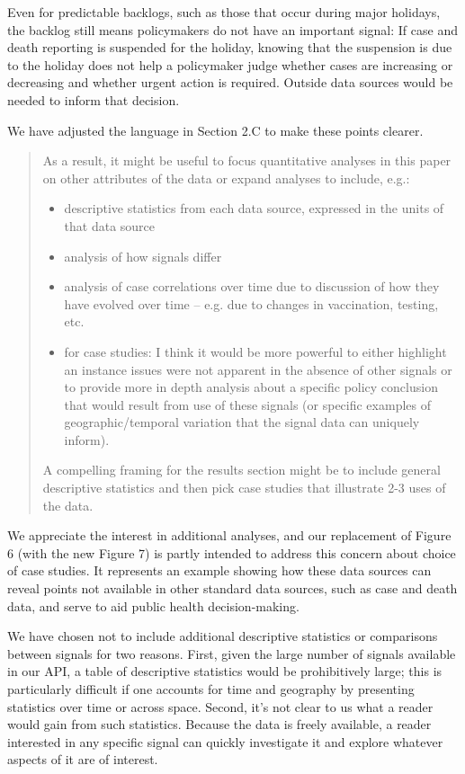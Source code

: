 \documentclass[11pt]{article}
\begin{document}
Even for predictable backlogs, such as those that occur during major holidays,
the backlog still means policymakers do not have an important signal: If case
and death reporting is suspended for the holiday, knowing that the suspension is
due to the holiday does not help a policymaker judge whether cases are
increasing or decreasing and whether urgent action is required. Outside data
sources would be needed to inform that decision.

We have adjusted the language in Section 2.C to make these points clearer.

\begin{quote}
  As a result, it might be useful to focus quantitative analyses in this paper
  on other attributes of the data or expand analyses to include, e.g.:
  \begin{itemize}
  \item descriptive statistics from each data source, expressed in the units of
    that data source
  \item analysis of how signals differ
  \item analysis of case correlations over time due to discussion of how they
    have evolved over time -- e.g. due to changes in vaccination, testing, etc.
  \item for case studies: I think it would be more powerful to either highlight
    an instance issues were not apparent in the absence of other signals or to
    provide more in depth analysis about a specific policy conclusion that would
    result from use of these signals (or specific examples of
    geographic/temporal variation that the signal data can uniquely inform).
  \end{itemize}
  A compelling framing for the results section might be to include general
  descriptive statistics and then pick case studies that illustrate 2-3 uses of
  the data.
\end{quote}
We appreciate the interest in additional analyses, and our replacement of Figure
6 (with the new Figure 7) is partly intended to address this concern about
choice of case studies. It represents an example showing how these data sources
can reveal points not available in other standard data sources, such as case and
death data, and serve to aid public health decision-making.

We have chosen not to include additional descriptive statistics or comparisons
between signals for two reasons. First, given the large number of signals
available in our API, a table of descriptive statistics would be prohibitively
large; this is particularly difficult if one accounts for time and geography by
presenting statistics over time or across space. Second, it's not clear to us
what a reader would gain from such statistics. Because the data is freely
available, a reader interested in any specific signal can quickly investigate it
and explore whatever aspects of it are of interest.
\end{document}
